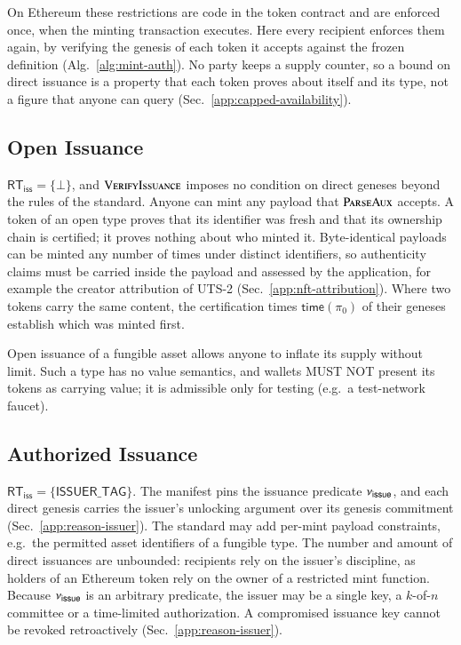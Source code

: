 On Ethereum these restrictions are code in the token contract and are enforced once, when the minting transaction executes. Here every recipient enforces them again, by verifying the genesis of each token it accepts against the frozen definition (Alg.~\ref{alg:mint-auth}). No party keeps a supply counter, so a bound on direct issuance is a property that each token proves about itself and its type, not a figure that anyone can query (Sec.~\ref{app:capped-availability}).

\subsection{Open Issuance}\label{app:policy-open}

$\mathsf{RT}_\mathsf{iss} = \{\bot\}$, and $\Call{VerifyIssuance}{}$ imposes no condition on direct geneses beyond the rules of the standard. Anyone can mint any payload that $\Call{ParseAux}{}$ accepts. A token of an open type proves that its identifier was fresh and that its ownership chain is certified; it proves nothing about who minted it. Byte-identical payloads can be minted any number of times under distinct identifiers, so authenticity claims must be carried inside the payload and assessed by the application, for example the creator attribution of UTS-2 (Sec.~\ref{app:nft-attribution}). Where two tokens carry the same content, the certification times $\mathsf{time}(\pi_0)$ of their geneses establish which was minted first.

Open issuance of a fungible asset allows anyone to inflate its supply without limit. Such a type has no value semantics, and wallets MUST NOT present its tokens as carrying value; it is admissible only for testing (e.g.\ a test-network faucet).

\subsection{Authorized Issuance}\label{app:policy-authorized}

$\mathsf{RT}_\mathsf{iss} = \{\mathsf{ISSUER\_TAG}\}$. The manifest pins the issuance predicate $\nu_\mathsf{issue}$, and each direct genesis carries the issuer's unlocking argument over its genesis commitment (Sec.~\ref{app:reason-issuer}). The standard may add per-mint payload constraints, e.g.\ the permitted asset identifiers of a fungible type. The number and amount of direct issuances are unbounded: recipients rely on the issuer's discipline, as holders of an Ethereum token rely on the owner of a restricted mint function. Because $\nu_\mathsf{issue}$ is an arbitrary predicate, the issuer may be a single key, a $k$-of-$n$ committee or a time-limited authorization. A compromised issuance key cannot be revoked retroactively (Sec.~\ref{app:reason-issuer}).

